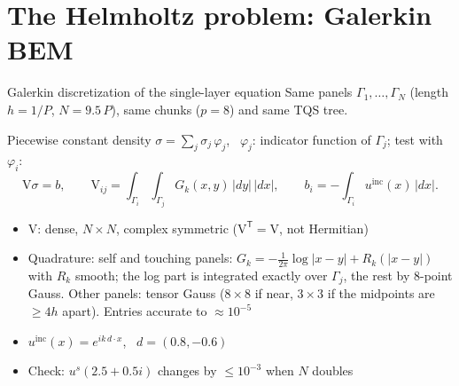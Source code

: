 \documentclass[aspectratio=169,11pt]{beamer}
\begin{document}
\section{The Helmholtz problem: Galerkin BEM}

\begin{frame}{Galerkin discretization of the single-layer equation}
\small
Same panels $\Gamma_1,\dots,\Gamma_N$ (length $h=1/P$, $N=9.5\,P$), same chunks ($p=8$) and same TQS tree.

\vspace{1mm}
Piecewise constant density $\sigma=\sum_j \sigma_j\,\varphi_j$, \ $\varphi_j$: indicator function of $\Gamma_j$; test with $\varphi_i$:
\[
\mathrm{V}\sigma=b,\qquad
\mathrm{V}_{ij}=\int_{\Gamma_i}\!\int_{\Gamma_j} G_k(x,y)\,|dy|\,|dx|,\qquad
b_i=-\int_{\Gamma_i}u^{\mathrm{inc}}(x)\,|dx|.
\]
\begin{itemize}
\item $\mathrm{V}$: dense, $N\times N$, complex symmetric ($\mathrm{V}^{\mathsf T}=\mathrm{V}$, not Hermitian)
\item Quadrature: self and touching panels: $G_k=-\tfrac{1}{2\pi}\log|x-y|+R_k(|x-y|)$ with $R_k$ smooth;
  the log part is integrated exactly over $\Gamma_j$, the rest by $8$-point Gauss. Other panels: tensor Gauss
  ($8\times8$ if near, $3\times3$ if the midpoints are $\ge4h$ apart). Entries accurate to $\approx10^{-5}$
\item $u^{\mathrm{inc}}(x)=e^{ik\,d\cdot x}$, \ $d=(0.8,-0.6)$
\item Check: $u^s(2.5+0.5i)$ changes by $\le10^{-3}$ when $N$ doubles
\end{itemize}
\end{frame}

\newcommand{\fieldplot}[2]{%
\begin{tikzpicture}
\begin{axis}[
  width=0.98\textwidth, axis equal image, enlargelimits=false,
  xmin=-2.5, xmax=2.5, ymin=-0.75, ymax=4.25,
  title={\footnotesize #2}, tick label style={font=\tiny},
  colormap={vir}{rgb255=(68,1,84) rgb255=(59,82,139) rgb255=(33,145,140) rgb255=(94,201,98) rgb255=(253,231,37)},
  point meta min=0, point meta max=2.5,
  colorbar, colorbar style={width=2mm, tick label style={font=\tiny}}]
\addplot graphics[xmin=-2.5, xmax=2.5, ymin=-0.75, ymax=4.25] {helmholtz_field_k#1.png};
\draw[white, line width=0.6pt] (axis cs:0,0) -- (axis cs:0,3.5) (axis cs:-1.5,1) -- (axis cs:1.5,1)
  (axis cs:-1,2) -- (axis cs:1,2) (axis cs:-0.5,3) -- (axis cs:0.5,3);
\end{axis}
\end{tikzpicture}}
\end{document}
